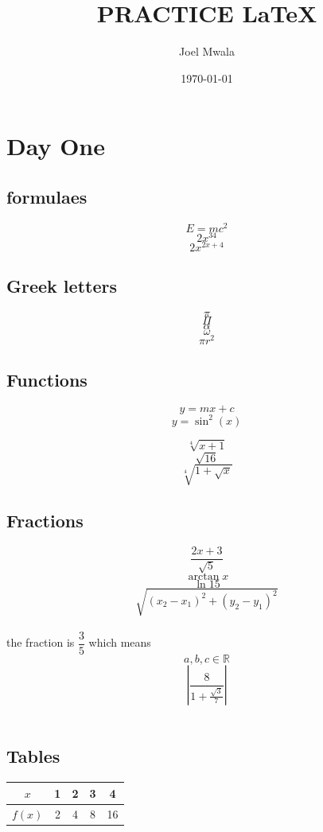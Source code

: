 \documentclass[11px, a4paper]{article}
\title{PRACTICE \LaTeX}
\author{Joel Mwala}
\date{\today}
\begin{document}
\maketitle
\tableofcontents
\section{Day One}
\subsection{formulaes}
$$E = mc^{2}$$
$$2x^{34}$$
$$2x^{2x+4}$$

\subsection{Greek letters}
$$\pi$$
$$\Pi$$
$$\alpha$$
$$\omega$$
$${\pi}r^2$$

\subsection{Functions}

$$y = mx+c$$
$$y = {\sin}^2 (x)$$

$$\sqrt[4]{x+1}$$
$$\sqrt{16}$$
$$\sqrt[4]{1 + \sqrt{x}}$$

\subsection{Fractions}

$$\frac{2x+3}{\sqrt{5}}$$
$$\arctan x$$
$$\ln 15$$
$$\sqrt{(x_2-x_1)^2+(y_2-y_1)^2}$$\\[6pt]

the fraction is $\dfrac{3}{5}$ which means \\[6pt]
$${a, b, c}\in \mathbb{R}$$
$$\left |\frac{8}{1 + \frac{\sqrt{3}}{7}}\right|$$\\[19px]

\subsection{Tables}


\begin{tabular}{|c||c|c|c|c|}
    \hline
    $x$    & 1 & 2 & 3 & 4  \\ \hline
    $f(x)$ & 2 & 4 & 8 & 16 \\ \hline
\end{tabular}

\vspace{1cm}
\end{document}
